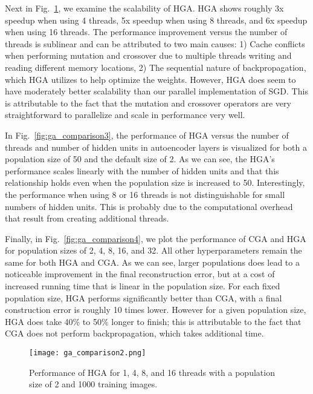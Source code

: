 Next in Fig.~\ref{fig:ga_comparison2}, we examine the scalability of HGA. HGA shows roughly 3x speedup when using 4 threads, 5x speedup when using 8 threads, and 6x speedup when using 16 threads. The performance improvement versus the number of threads is sublinear and can be attributed to two main causes: 1) Cache conflicts when performing mutation and crossover due to multiple threads writing and reading different memory locations, 2) The sequential nature of backpropagation, which HGA utilizes to help optimize the weights. However, HGA does seem to have moderately better scalability than our parallel implementation of SGD. This is attributable to the fact that the mutation and crossover operators are very straightforward to parallelize and scale in performance very well. 

In Fig.~\ref{fig:ga_comparison3}, the performance of HGA versus the number of threads and number of hidden units in autoencoder layers is visualized for both a population size of 50 and the default size of 2. As we can see, the HGA's performance scales linearly with the number of hidden units and that this relationship holds even when the population size is increased to 50. Interestingly, the performance when using 8 or 16 threads is not distinguishable for small numbers of hidden units. This is probably due to the computational overhead that result from creating additional threads.

Finally, in Fig.~\ref{fig:ga_comparison4}, we plot the performance of CGA and HGA for population sizes of 2, 4, 8, 16, and 32. All other hyperparameters remain the same for both HGA and CGA. As we can see, larger populations does lead to a noticeable improvement in the final reconstruction error, but at a cost of increased running time that is linear in the population size. For each fixed population size, HGA performs significantly better than CGA, with a final construction error is roughly 10 times lower. However for a given population size, HGA does take 40\% to 50\% longer to finish; this is attributable to the fact that CGA does not perform backpropagation, which takes additional time. 

\begin{figure}[h] \centering
  \texttt{[image: ga\_comparison2.png]}
  \caption{Performance of HGA for 1, 4, 8, and 16 threads with a population size of 2 and 1000 training images.}
  \label{fig:ga_comparison2}
\end{figure}

\begin{figure*}[h]
  \centering
  \caption{Comparison of performance versus number of threads and number of hidden units in autoencoder layer for HGA with population size (a) 2 and (b) 50.}
  \label{fig:ga_comparison3}
\end{figure*}

